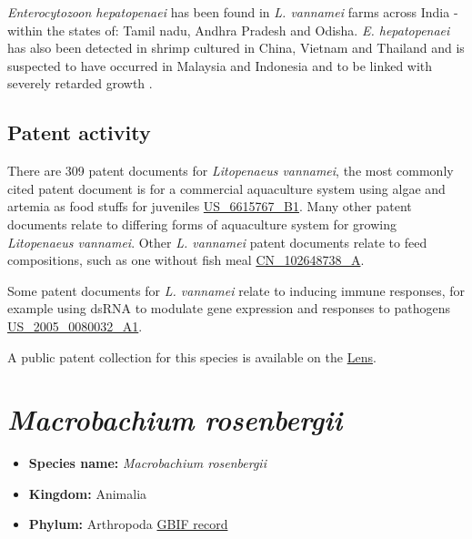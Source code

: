 \documentclass[]{book}
\providecommand{\tightlist}{%
  \setlength{\itemsep}{0pt}\setlength{\parskip}{0pt}}
\theoremstyle{definition}
\theoremstyle{definition}
\theoremstyle{definition}
\theoremstyle{remark}
\begin{document}
\emph{Enterocytozoon hepatopenaei} has been found in \emph{L. vannamei}
farms across India - within the states of: Tamil nadu, Andhra Pradesh
and Odisha. \emph{E. hepatopenaei} has also been detected in shrimp
cultured in China, Vietnam and Thailand and is suspected to have
occurred in Malaysia and Indonesia and to be linked with severely
retarded growth \citep{Biju_2016}.

\hypertarget{patent-activity-2}{%
\subsection{Patent activity}\label{patent-activity-2}}

There are 309 patent documents for \emph{Litopenaeus vannamei}, the most
commonly cited patent document is for a commercial aquaculture system
using algae and artemia as food stuffs for juveniles
\href{https://www.lens.org/lens/patent/US_6615767_B1}{US\_6615767\_B1}.
Many other patent documents relate to differing forms of aquaculture
system for growing \emph{Litopenaeus vannamei}. Other \emph{L. vannamei}
patent documents relate to feed compositions, such as one without fish
meal
\href{https://www.lens.org/lens/patent/CN_102648738_A}{CN\_102648738\_A}.

Some patent documents for \emph{L. vannamei} relate to inducing immune
responses, for example using dsRNA to modulate gene expression and
responses to pathogens
\href{https://www.lens.org/lens/patent/US_2005_0080032_A1}{US\_2005\_0080032\_A1}.

A public patent collection for this species is available on the
\href{https://www.lens.org/lens/collection/167171}{Lens}.

\hypertarget{macrobachium-rosenbergii}{%
\section{\texorpdfstring{\emph{Macrobachium
rosenbergii}}{Macrobachium rosenbergii}}\label{macrobachium-rosenbergii}}

\begin{itemize}
\tightlist
\item
  \textbf{Species name:} \emph{Macrobachium rosenbergii}\\
\item
  \textbf{Kingdom:} Animalia\\
\item
  \textbf{Phylum:} Arthropoda
  \href{https://www.gbif.org/species/2224546}{GBIF record}
\end{itemize}
\end{document}
